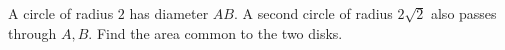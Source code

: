 A circle of radius $2$ has diameter $AB$. A second circle of radius $2\sqrt2$ also passes through $A,B$. Find the area common to the two disks.
